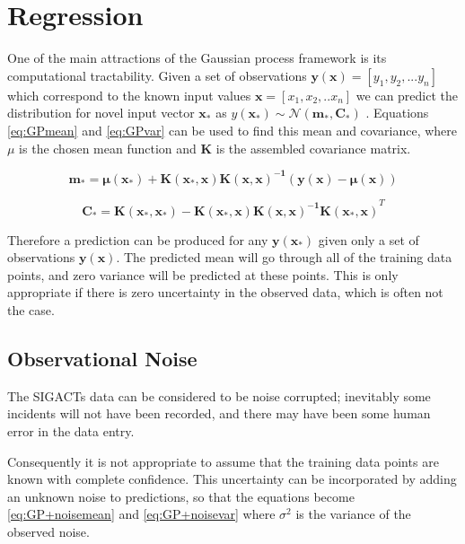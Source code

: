 \documentclass[a4paper,11pt]{report}
\begin{document}
\section{Regression}

One of the main attractions of the Gaussian process framework is its computational tractability. Given a set of observations \( \mathbf{y}( \mathbf{x} ) = [y_1, y_2, ... y_n] \) which correspond to the known input values \( \mathbf{x} = [x_1, x_2, .. x_n] \) we can predict the distribution for novel input vector \( \mathbf{x_*} \) as \( y( \mathbf{x_*}) \sim \mathcal{N}(\mathbf{m_*,C_*}) \) \cite{GP-robots}. Equations \ref{eq:GPmean} and \ref{eq:GPvar} can be used to find this mean and covariance, where \(\mu\) is the chosen mean function and \(\mathbf{K}\) is the assembled covariance matrix.

\singlespacing

\begin{equation} \label{eq:GPmean}
\mathbf{m_* = \mu (x_*) + K(x_* ,x) K(x,x)^{-1} (y(x) - \mu (x))}
\end{equation}

\begin{equation} \label{eq:GPvar}
\mathbf{C_* = K(x_*,x_*)-K(x_*,x) K(x,x)^{-1} K(x_*,x)}^{T}
\end{equation}

\doublespacing

Therefore a prediction can be produced for any \(\mathbf{y(x_*)}\) given only a set of observations \(\mathbf{y(x)}\). The predicted mean will go through all of the training data points, and zero variance will be predicted at these points. This is only appropriate if there is zero uncertainty in the observed data, which is often not the case.

\subsection{Observational Noise}

The SIGACTs data can be considered to be noise corrupted; inevitably some incidents will not have been recorded, and there may have been some human error in the data entry. 

Consequently it is not appropriate to assume that the training data points are known with complete confidence. This uncertainty can be incorporated by adding an unknown noise to predictions, so that the equations become \ref{eq:GP+noisemean} and \ref{eq:GP+noisevar} where \( \sigma^2 \) is the variance of the observed noise.
\end{document}
